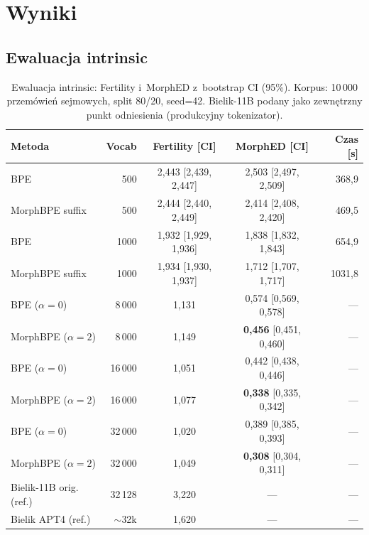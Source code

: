 \section{Wyniki}
\label{sec:results}

\subsection*{Ewaluacja intrinsic}

\begin{table}[h]
  \centering
  \caption{Ewaluacja intrinsic: Fertility i~MorphED z~bootstrap CI (95\%).
  Korpus: 10\,000 przemówień sejmowych, split 80/20, seed=42.
  Bielik-11B podany jako zewnętrzny punkt odniesienia (produkcyjny tokenizator).}
  \label{tab:intrinsic}
  \begin{tabular}{lrccr}
    \toprule
    Metoda & Vocab & Fertility [CI] & MorphED [CI] & Czas [s] \\
    \midrule
    BPE                  & 500  & 2{,}443 [2{,}439, 2{,}447] & 2{,}503 [2{,}497, 2{,}509] & 368{,}9 \\
    MorphBPE suffix      & 500  & 2{,}444 [2{,}440, 2{,}449] & 2{,}414 [2{,}408, 2{,}420] & 469{,}5 \\
    \addlinespace
    BPE                  & 1000 & 1{,}932 [1{,}929, 1{,}936] & 1{,}838 [1{,}832, 1{,}843] & 654{,}9 \\
    MorphBPE suffix      & 1000 & 1{,}934 [1{,}930, 1{,}937] & 1{,}712 [1{,}707, 1{,}717] & 1031{,}8 \\
    \addlinespace
    BPE ($\alpha{=}0$)   & 8\,000 & 1{,}131 & 0{,}574 [0{,}569, 0{,}578] & --- \\
    MorphBPE ($\alpha{=}2$) & 8\,000 & 1{,}149 & \textbf{0{,}456} [0{,}451, 0{,}460] & --- \\
    \addlinespace
    BPE ($\alpha{=}0$)   & 16\,000 & 1{,}051 & 0{,}442 [0{,}438, 0{,}446] & --- \\
    MorphBPE ($\alpha{=}2$) & 16\,000 & 1{,}077 & \textbf{0{,}338} [0{,}335, 0{,}342] & --- \\
    \addlinespace
    BPE ($\alpha{=}0$)   & 32\,000 & 1{,}020 & 0{,}389 [0{,}385, 0{,}393] & --- \\
    MorphBPE ($\alpha{=}2$) & 32\,000 & 1{,}049 & \textbf{0{,}308} [0{,}304, 0{,}311] & --- \\
    \addlinespace
    \rowcolor{slayergray}
    Bielik-11B orig. (ref.) & 32\,128 & 3{,}220 & --- & --- \\
    \rowcolor{slayergray}
    Bielik APT4 (ref.)   & $\sim$32k & 1{,}620 & --- & --- \\
    \bottomrule
  \end{tabular}
\end{table}


